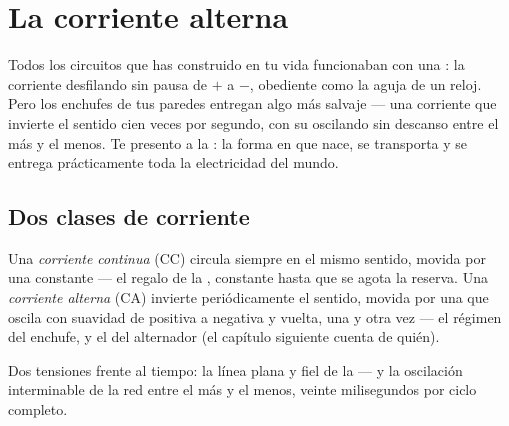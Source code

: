 \chapter{La corriente alterna}\label{ch:g9:alternating-current}

Todos los circuitos que has construido en tu vida funcionaban con una
: la corriente desfilando sin pausa de $+$ a $-$, obediente
como la aguja de un reloj. Pero los enchufes de tus paredes entregan
algo más salvaje --- una corriente que invierte el sentido cien veces
por segundo, con su  oscilando sin descanso entre el más y
el menos. Te presento a la : la forma en que nace,
se transporta y se entrega prácticamente toda la electricidad del
mundo.

\section{Dos clases de corriente}

\begin{definition}\label{def:g9:alternating-current:dcac}
Una \emph{corriente continua} (CC) circula
siempre en el mismo sentido, movida por una  constante ---
el regalo de la , constante hasta que se agota la reserva.
Una \emph{corriente alterna} (CA) invierte
periódicamente el sentido, movida por una  que oscila con
suavidad de positiva a negativa y vuelta, una y otra vez --- el régimen
del enchufe, y el del alternador (el capítulo siguiente cuenta de
quién).
\end{definition}

\begin{omfigure}

{\small Dos tensiones frente al tiempo: la línea plana y fiel de la
 --- y la oscilación interminable de la red entre el más y
el menos, veinte milisegundos por ciclo completo.}
\end{omfigure}

